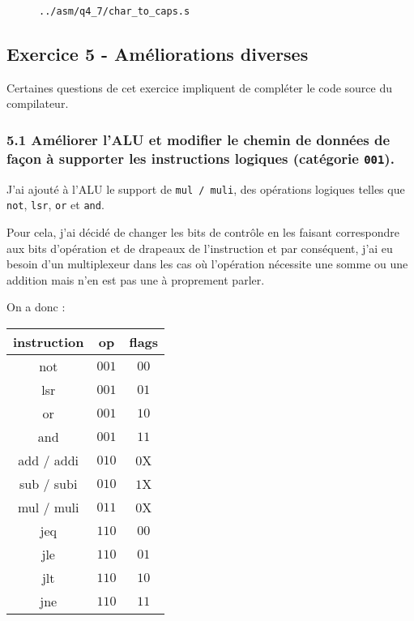 \documentclass[twoside, 12pt, a4paper]{article}
\newcommand{\fm}[2]{
\begin{figure}[!h]
    \centering
    \inputminted[]{asm}{#1}
    \caption{\texttt{#2}}
\end{figure}
}
\begin{document}
\fm{../asm/q4_7/char_to_caps.s}{../asm/q4\_7/char\_to\_caps.s}


                
        \clearpage

        \subsection{Exercice 5 - Améliorations diverses}

Certaines questions de cet exercice impliquent de compléter le code source du compilateur.

        \subsubsection*{\textbf{5.1} Améliorer l'ALU et modifier le chemin de données de façon à supporter les instructions logiques (catégorie \texttt{001}).}

        J'ai ajouté à l'ALU le support de \texttt{mul / muli}, des opérations logiques telles que \texttt{not}, \texttt{lsr}, \texttt{or} et \texttt{and}.

        Pour cela, j'ai décidé de changer les bits de contrôle en les faisant correspondre aux bits d'opération et de drapeaux de l'instruction et par conséquent, j'ai eu besoin d'un multiplexeur dans les cas où l'opération nécessite une somme ou une addition mais n'en est pas une à proprement parler.

        On a donc :
        \begin{center}
            
        \ttfamily
        \begin{tabular}{|c|c|c|}
             \hline
             instruction & op & flags\\
             \hline
             not & $001$ & $00$\\
             lsr & $001$ & $01$\\
             or  & $001$ & $10$\\
             and & $001$ & $11$\\
             \hline
             add / addi & $010$ & $0$X\\
             sub / subi & $010$ &$1$X\\
             \hline
             mul / muli & $011$ & $0$X\\
             \hline
             jeq & $110$ & $00$\\
             jle & $110$ & $01$\\
             jlt & $110$ & $10$\\
             jne & $110$ & $11$\\
             \hline
        \end{tabular}

        \end{center}
        
\end{document}

